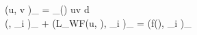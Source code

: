 \left(u, v \right)_{\tau} = \int_{\Omega(\tau)} uv d\Omega \\ 
\left(, \phi_i \right)_{\tau} + \left(L_{WF}(u, \tau), \phi_i \right)_{\tau} = \left(f(\tau), \phi_i \right)_{\tau}

